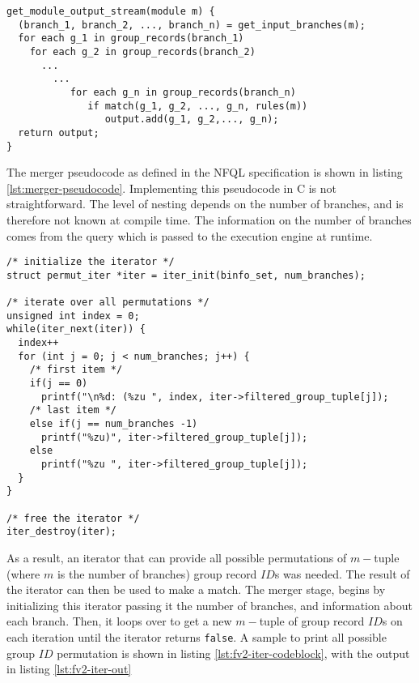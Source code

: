 \begin{lstlisting}
get_module_output_stream(module m) {
  (branch_1, branch_2, ..., branch_n) = get_input_branches(m);
  for each g_1 in group_records(branch_1)
    for each g_2 in group_records(branch_2)
      ...
        ...
           for each g_n in group_records(branch_n)
              if match(g_1, g_2, ..., g_n, rules(m))
                 output.add(g_1, g_2,..., g_n);
  return output;
}
\end{lstlisting}

The merger pseudocode as defined in the \ac{NFQL} specification
\cite{vmarinov:2009} is shown in listing \ref{lst:merger-pseudocode}.
Implementing this pseudocode in C is not straightforward. The level of nesting
depends on the number of branches, and is therefore not known at compile time.
The information on the number of branches comes from the query which is passed
to the execution engine at runtime.

\begin{lstlisting}
/* initialize the iterator */
struct permut_iter *iter = iter_init(binfo_set, num_branches);

/* iterate over all permutations */
unsigned int index = 0;
while(iter_next(iter)) {
  index++
  for (int j = 0; j < num_branches; j++) {
    /* first item */
    if(j == 0)
      printf("\n%d: (%zu ", index, iter->filtered_group_tuple[j]);
    /* last item */
    else if(j == num_branches -1)
      printf("%zu)", iter->filtered_group_tuple[j]);
    else
      printf("%zu ", iter->filtered_group_tuple[j]);
  }
}

/* free the iterator */
iter_destroy(iter);
\end{lstlisting}

As a result, an iterator that can provide all possible permutations of
$m-$tuple (where $m$ is the number of branches) group record $ID$s was needed.
The result of the iterator can then be used to make a match. The merger stage,
begins by initializing this iterator passing  it the number of branches, and information about each branch. Then,
it loops over to get a new $m-$tuple of group record $ID$s on each iteration
until the iterator returns \texttt{false}. A sample to print all possible
group $ID$ permutation is shown in listing \ref{lst:fv2-iter-codeblock}, with
the output in listing \ref{lst:fv2-iter-out}

